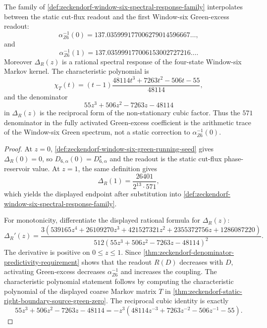 \begin{theorem}
\label{thm:zeckendorf-spectral-response-interpolation}
The family of
\autoref{def:zeckendorf-window-six-spectral-response-family} interpolates
between the static cut-flux readout and the first Window-six
Green-excess readout:
$$
  \alpha_{Z6}^{-1}(0)
  =
  137.035999177006279014596667\ldots,
$$
and
$$
  \alpha_{Z6}^{-1}(1)
  =
  137.035999177006153002727216\ldots.
$$
Moreover $\Delta_R(z)$ is a rational spectral response of the four-state
Window-six Markov kernel. The characteristic polynomial is
$$
  \chi_T(t)
  =
  (t-1)
  \frac{48114t^3+7263t^2-506t-55}{48114},
$$
and the denominator
$$
  55z^3+506z^2-7263z-48114
$$
in $\Delta_R(z)$ is the reciprocal form of the non-stationary cubic
factor. Thus the $571$ denominator in the fully activated Green-excess
coefficient is the arithmetic trace of the Window-six Green spectrum, not
a static correction to $\alpha_{Z6}^{-1}(0)$.
\end{theorem}
\begin{proof}
At $z=0$, \autoref{def:zeckendorf-window-six-green-running-seed} gives
$\Delta_R(0)=0$, so $D_{6,\alpha}(0)=D_{6,\alpha}^{\star}$ and the
readout is the static cut-flux phase-reservoir value. At $z=1$, the same
definition gives
$$
  \Delta_R(1)=\frac{26401}{2^{13}\cdot571},
$$
which yields the displayed endpoint after substitution into
\autoref{def:zeckendorf-window-six-spectral-response-family}.

For monotonicity, differentiate the displayed rational formula for
$\Delta_R(z)$:
$$
  \Delta_R'(z)
  =
  \frac{
    3(539165z^4+26109270z^3+421527321z^2
    +2355372756z+1286087220)
  }{
    512(55z^3+506z^2-7263z-48114)^2
  }.
$$
The derivative is positive on $0\leq z\leq1$. Since
\autoref{thm:zeckendorf-denominator-predictivity-requirement} shows that
the readout $R(D)$ decreases with $D$, activating Green-excess decreases
$\alpha_{Z6}^{-1}$ and increases the coupling. The characteristic
polynomial statement follows by computing the characteristic polynomial
of the displayed coarse Markov matrix $T$ in
\autoref{thm:zeckendorf-static-right-boundary-source-green-zero}. The
reciprocal cubic identity is exactly
$$
  55z^3+506z^2-7263z-48114
  =
  -z^3
  \left(
    48114z^{-3}+7263z^{-2}-506z^{-1}-55
  \right).
$$
\end{proof}

